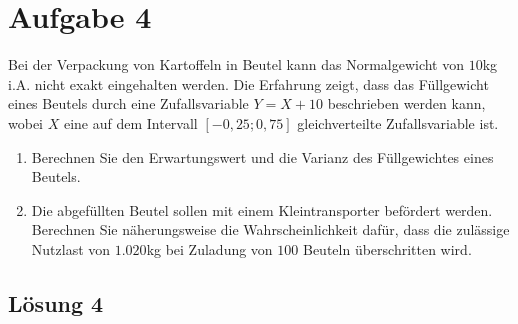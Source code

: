 \documentclass[main.tex]{subfiles}
\begin{document}
\section{Aufgabe 4}
Bei der Verpackung von Kartoffeln in Beutel kann das Normalgewicht von $10$kg i.A. nicht exakt 
eingehalten werden. Die Erfahrung zeigt, dass das Füllgewicht eines Beutels durch eine Zufallsvariable
$Y=X+10$ beschrieben werden kann, wobei $X$ eine auf dem Intervall $[-0,25;0,75]$ gleichverteilte 
Zufallsvariable ist.
\begin{enumerate}
\item Berechnen Sie den Erwartungswert und die Varianz des Füllgewichtes eines Beutels.
\item Die abgefüllten Beutel sollen mit einem Kleintransporter befördert werden. Berechnen Sie näherungsweise die Wahrscheinlichkeit dafür, dass die zulässige Nutzlast von $1.020$kg bei Zuladung von $100$ Beuteln überschritten wird.
\end{enumerate}

\subsection{Lösung 4}
\end{document}
